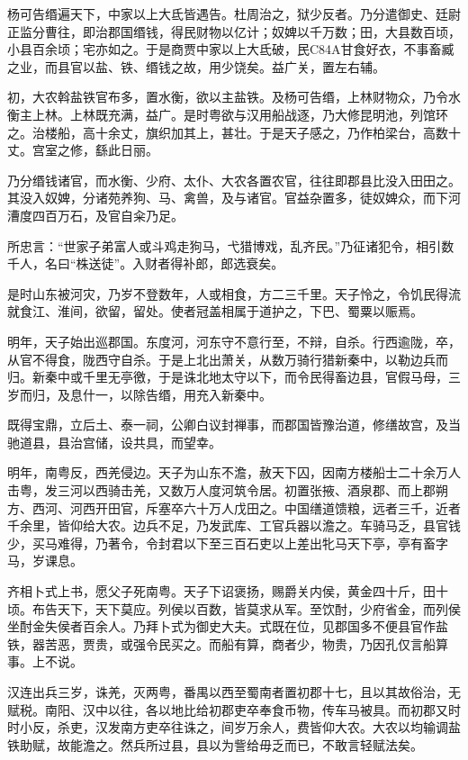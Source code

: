 \documentclass[]{article}
\begin{document}
杨可告缗遍天下，中家以上大氐皆遇告。杜周治之，狱少反者。乃分遣御史、廷尉正监分曹往，即治郡国缗钱，得民财物以亿计；奴婢以千万数；田，大县数百顷，小县百余顷；宅亦如之。于是商贾中家以上大氐破，民C84A甘食好衣，不事畜臧之业，而县官以盐、铁、缗钱之故，用少饶矣。益广关，置左右辅。

初，大农斡盐铁官布多，置水衡，欲以主盐铁。及杨可告缗，上林财物众，乃令水衡主上林。上林既充满，益广。是时粤欲与汉用船战逐，乃大修昆明池，列馆环之。治楼船，高十余丈，旗织加其上，甚壮。于是天子感之，乃作柏梁台，高数十丈。宫室之修，繇此日丽。

乃分缗钱诸官，而水衡、少府、太仆、大农各置农官，往往即郡县比没入田田之。其没入奴婢，分诸苑养狗、马、禽兽，及与诸官。官益杂置多，徒奴婢众，而下河漕度四百万石，及官自籴乃足。

所忠言：``世家子弟富人或斗鸡走狗马，弋猎博戏，乱齐民。''乃征诸犯令，相引数千人，名曰``株送徒''。入财者得补郎，郎选衰矣。

是时山东被河灾，乃岁不登数年，人或相食，方二三千里。天子怜之，令饥民得流就食江、淮间，欲留，留处。使者冠盖相属于道护之，下巴、蜀粟以赈焉。

明年，天子始出巡郡国。东度河，河东守不意行至，不辩，自杀。行西逾陇，卒，从官不得食，陇西守自杀。于是上北出萧关，从数万骑行猎新秦中，以勒边兵而归。新秦中或千里无亭徼，于是诛北地太守以下，而令民得畜边县，官假马母，三岁而归，及息什一，以除告缗，用充入新秦中。

既得宝鼎，立后土、泰一祠，公卿白议封禅事，而郡国皆豫治道，修缮故宫，及当驰道县，县治宫储，设共具，而望幸。

明年，南粤反，西羌侵边。天子为山东不澹，赦天下囚，因南方楼船士二十余万人击粤，发三河以西骑击羌，又数万人度河筑令居。初置张掖、酒泉郡、而上郡朔方、西河、河西开田官，斥塞卒六十万人戊田之。中国缮道馈粮，远者三千，近者千余里，皆仰给大农。边兵不足，乃发武库、工官兵器以澹之。车骑马乏，县官钱少，买马难得，乃著令，令封君以下至三百石吏以上差出牝马天下亭，亭有畜字马，岁课息。

齐相卜式上书，愿父子死南粤。天子下诏褒扬，赐爵关内侯，黄金四十斤，田十顷。布告天下，天下莫应。列侯以百数，皆莫求从军。至饮酎，少府省金，而列侯坐酎金失侯者百余人。乃拜卜式为御史大夫。式既在位，见郡国多不便县官作盐铁，器苦恶，贾贵，或强令民买之。而船有算，商者少，物贵，乃因孔仅言船算事。上不说。

汉连出兵三岁，诛羌，灭两粤，番禺以西至蜀南者置初郡十七，且以其故俗治，无赋税。南阳、汉中以往，各以地比给初郡吏卒奉食币物，传车马被具。而初郡又时时小反，杀吏，汉发南方吏卒往诛之，间岁万余人，费皆仰大农。大农以均输调盐铁助赋，故能澹之。然兵所过县，县以为訾给毋乏而已，不敢言轻赋法矣。
\end{document}
